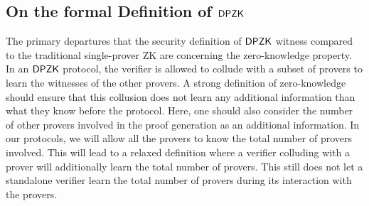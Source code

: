 \subsection{On the formal Definition of $\mathsf{DPZK}$}
 The primary departures that the security definition of $\mathsf{DPZK}$ witness compared to the  traditional single-prover ZK are concerning the zero-knowledge property.     
In an $\mathsf{DPZK}$ protocol, the verifier is allowed to collude with a subset of provers to learn the witnesses of the other provers. A strong definition of zero-knowledge should ensure that this collusion does not learn any additional information than what they know before the protocol. Here, one should also consider the number of other provers involved in the proof generation as an additional information. In our protocols, we will allow all the provers to know the total number of provers involved. This will lead to a relaxed definition where a verifier colluding with a prover will additionally learn the total number of provers. This still does not let a standalone verifier learn the total number of provers during its interaction with the provers.


